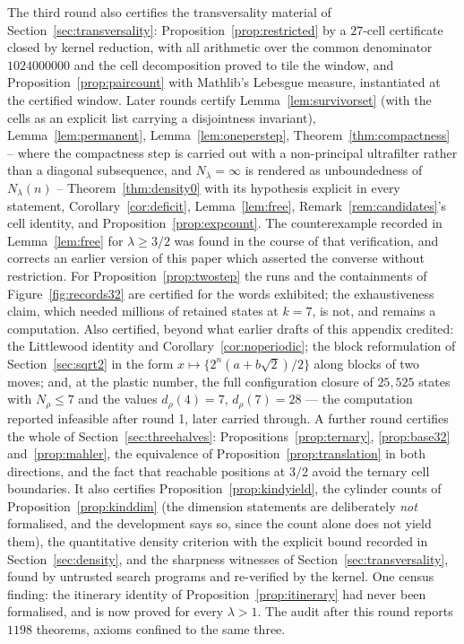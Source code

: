 \documentclass[11pt,reqno]{amsart}
\theoremstyle{plain}
\theoremstyle{definition}
\theoremstyle{remark}
\begin{document}
The third round also certifies the transversality material of
Section~\ref{sec:transversality}: Proposition~\ref{prop:restricted} by a
$27$-cell certificate closed by kernel reduction, with all arithmetic over the
common denominator $1024000000$ and the cell decomposition proved to tile the
window, and Proposition~\ref{prop:paircount} with Mathlib's Lebesgue measure,
instantiated at the certified window. Later rounds certify Lemma~\ref{lem:survivorset} (with the cells as an
explicit list carrying a disjointness invariant), Lemma~\ref{lem:permanent},
Lemma~\ref{lem:oneperstep}, Theorem~\ref{thm:compactness} -- where the
compactness step is carried out with a non-principal ultrafilter rather than a
diagonal subsequence, and $N_\lambda=\infty$ is rendered as unboundedness of
$N_\lambda(n)$ -- Theorem~\ref{thm:density0} with its hypothesis explicit in
every statement, Corollary~\ref{cor:deficit}, Lemma~\ref{lem:free},
Remark~\ref{rem:candidates}'s cell identity, and
Proposition~\ref{prop:expcount}. The counterexample recorded in
Lemma~\ref{lem:free} for $\lambda\geq3/2$ was found in the course of that
verification, and corrects an earlier version of this paper which asserted the
converse without restriction. For Proposition~\ref{prop:twostep} the runs and
the containments of Figure~\ref{fig:records32} are certified for the words
exhibited; the exhaustiveness claim, which needed millions of retained states
at $k=7$, is not, and remains a computation. Also certified, beyond what earlier drafts of this appendix credited: the
Littlewood identity and Corollary~\ref{cor:noperiodic}; the block
reformulation of Section~\ref{sec:sqrt2} in the form
$x\mapsto\{2^n(a+b\sqrt2)/2\}$ along blocks of two moves; and, at the plastic
number, the full configuration closure of $25{,}525$ states with
$N_\rho\leq7$ and the values $d_\rho(4)=7$, $d_\rho(7)=28$ --- the computation
reported infeasible after round 1, later carried through. A further round certifies the whole of Section~\ref{sec:threehalves}:
Propositions~\ref{prop:ternary}, \ref{prop:base32} and~\ref{prop:mahler}, the
equivalence of Proposition~\ref{prop:translation} in both directions, and the
fact that reachable positions at $3/2$ avoid the ternary cell boundaries. It
also certifies Proposition~\ref{prop:kindyield}, the cylinder counts of
Proposition~\ref{prop:kinddim} (the dimension statements are deliberately
\emph{not} formalised, and the development says so, since the count alone does
not yield them), the quantitative density criterion with the explicit bound
recorded in Section~\ref{sec:density}, and the sharpness witnesses of
Section~\ref{sec:transversality}, found by untrusted search programs and
re-verified by the kernel. One census finding: the itinerary identity of
Proposition~\ref{prop:itinerary} had never been formalised, and is now proved
for every $\lambda>1$. The audit after this round reports $1198$ theorems,
axioms confined to the same three.
\end{document}
